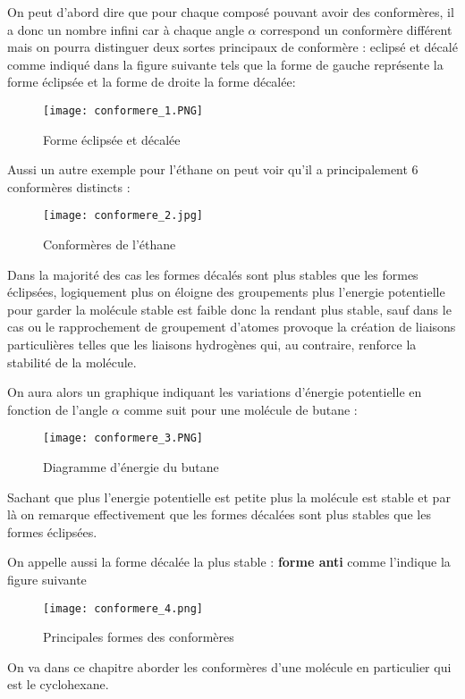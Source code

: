 \documentclass[a4paper, oneside]{book}
\begin{document}
On peut d'abord dire que pour chaque composé pouvant avoir des conformères, il a donc un nombre infini car à chaque angle $\alpha$ correspond un conformère différent mais on pourra distinguer deux sortes principaux de conformère : eclipsé et décalé comme indiqué dans la figure suivante tels que la forme de gauche représente la forme éclipsée et la forme de droite la forme décalée: 
\begin{figure}[!h]
    \centering
    \texttt{[image: conformere\_1.PNG]}
    \caption{Forme éclipsée et décalée}
    \label{fig:my_label}
\end{figure}
\newline
Aussi un autre exemple pour l'éthane on peut voir qu'il a principalement 6 conformères distincts :
\begin{figure}[!h]
    \centering
    \texttt{[image: conformere\_2.jpg]}
    \caption{Conformères de l'éthane}
    \label{fig:my_label}
\end{figure}

Dans la majorité des cas les formes décalés sont plus stables que les formes éclipsées, logiquement plus on éloigne des groupements plus l'energie potentielle pour garder la molécule stable est faible donc la rendant plus stable, sauf dans le cas ou le rapprochement de groupement d'atomes provoque la création de liaisons particulières telles que les liaisons hydrogènes qui, au contraire, renforce la stabilité de la molécule. 

On aura alors un graphique indiquant les variations d'énergie potentielle en fonction de l'angle $\alpha$ comme suit pour une molécule de butane : 
\begin{figure}[!h]
    \centering
    \texttt{[image: conformere\_3.PNG]}
    \caption{Diagramme d'énergie du butane}
    \label{fig:my_label}
\end{figure}
\newpage
Sachant que plus l'energie potentielle est petite plus la molécule est stable et par là on remarque effectivement que les formes décalées sont plus stables que les formes éclipsées.

On appelle aussi la forme décalée la plus stable : \textbf{forme anti} comme l'indique la figure suivante 
\begin{figure}
    \centering
    \texttt{[image: conformere\_4.png]}
    \caption{Principales formes des conformères}
    \label{fig:my_label}
\end{figure}

On va dans ce chapitre aborder les conformères d'une molécule en particulier qui est le cyclohexane.
\end{document}
